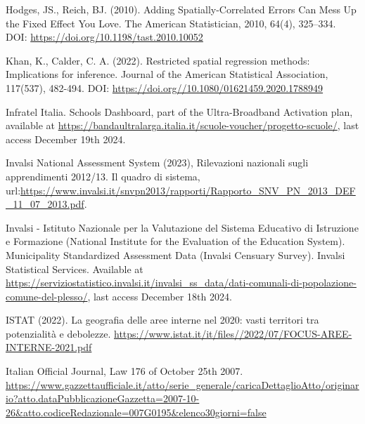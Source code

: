 \documentclass{article}
\begin{document}
\begin{thebibliography}{99}
Hodges, JS., Reich, BJ. (2010). Adding Spatially-Correlated Errors Can Mess Up the Fixed
Effect You Love. The American Statistician, 2010, 64(4), 325–334. DOI: \url{https://doi.org/10.1198/tast.2010.10052}

Khan, K., Calder, C. A. (2022). Restricted spatial regression methods: Implications for inference. Journal of the American Statistical Association, 117(537), 482-494. DOI: \url{https://doi.org//10.1080/01621459.2020.1788949}

Infratel Italia. Schools Dashboard, part of the Ultra-Broadband Activation plan, available at \url{https://bandaultralarga.italia.it/scuole-voucher/progetto-scuole/}, last access December 19th 2024.

Invalsi National Assessment System (2023), Rilevazioni nazionali sugli apprendimenti 2012/13. Il quadro di sistema, url:\url{https://www.invalsi.it/snvpn2013/rapporti/Rapporto_SNV_PN_2013_DEF_11_07_2013.pdf}.

Invalsi - Istituto Nazionale per la Valutazione del Sistema Educativo di Istruzione e Formazione (National Institute for the Evaluation of the Education System). Municipality Standardized Assessment Data (Invalsi Censuary Survey). Invalsi Statistical Services. Available at \url{https://serviziostatistico.invalsi.it/invalsi_ss_data/dati-comunali-di-popolazione-comune-del-plesso/}, last access December 18th 2024.

ISTAT (2022). La geografia delle aree interne nel 2020: vasti territori tra potenzialità e debolezze. \url{https://www.istat.it/it/files//2022/07/FOCUS-AREE-INTERNE-2021.pdf}

Italian Official Journal, Law 176 of October 25th 2007. \url{https://www.gazzettaufficiale.it/atto/serie_generale/caricaDettaglioAtto/originario?atto.dataPubblicazioneGazzetta=2007-10-26&atto.codiceRedazionale=007G0195&elenco30giorni=false}




\end{thebibliography}
\end{document}
